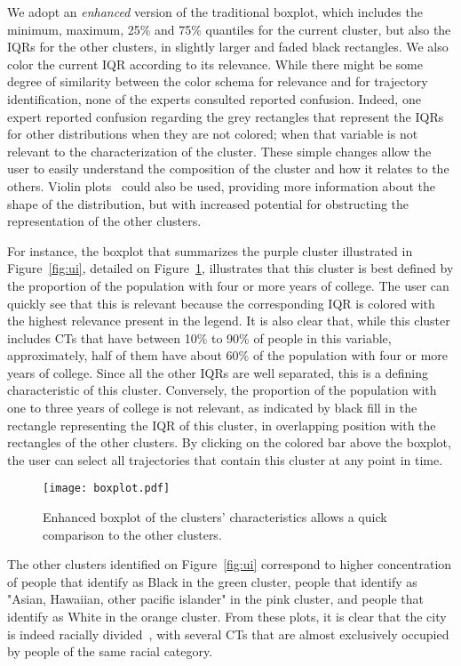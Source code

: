 We adopt an \emph{enhanced} version of the traditional boxplot, which includes
the minimum, maximum, 25\% and 75\% quantiles for the current cluster, but also
the IQRs for the other clusters, in slightly larger and faded black rectangles.
We also color the current IQR according to its relevance. While there might be
some degree of similarity between the color schema for relevance and for
trajectory identification, none of the experts consulted reported confusion.
Indeed, one expert reported confusion regarding the grey rectangles that
represent the IQRs for other distributions when they are not colored; when that
variable is not relevant to the characterization of the cluster. These simple
changes allow the user to easily understand the composition of the cluster and
how it relates to the others. Violin plots~\cite{hintze1998violin} could also be
used, providing more information about the shape of the distribution, but with
increased potential for obstructing the representation of the other clusters.


For instance, the boxplot that summarizes the purple cluster illustrated in
Figure~\ref{fig:ui}, detailed on Figure~\ref{fig:boxplot}, illustrates that this
cluster is best defined by the proportion of the population with four or more
years of college. The user can quickly see that this is relevant because the
corresponding IQR is colored with the highest relevance present in the legend.
It is also clear that, while this cluster includes CTs that have between 10\% to
90\% of people in this variable, approximately, half of them have about 60\% of
the population with four or more years of college. Since all the other IQRs are
well separated, this is a defining characteristic of this cluster. Conversely,
the proportion of the population with one to three years of college is not
relevant, as indicated by black fill in the rectangle representing the IQR of
this cluster, in overlapping position with the rectangles of the other clusters.
By clicking on the colored bar above the boxplot, the user can select all
trajectories that contain this cluster at any point in time.

\begin{figure}
    \centering 
    \texttt{[image: boxplot.pdf]}
    \caption{Enhanced boxplot of the clusters' characteristics allows a quick
    comparison to the other clusters.\label{fig:boxplot}}
\end{figure}


The other clusters identified on Figure~\ref{fig:ui} correspond to higher
concentration of people that identify as Black in the green cluster, people that
identify as "Asian, Hawaiian, other pacific islander" in the pink cluster, and
people that identify as White in the orange cluster. From these plots, it is
clear that the city is indeed racially divided~\cite{Delmelle2016}, with several
CTs that are almost exclusively occupied by people of the same racial category.



